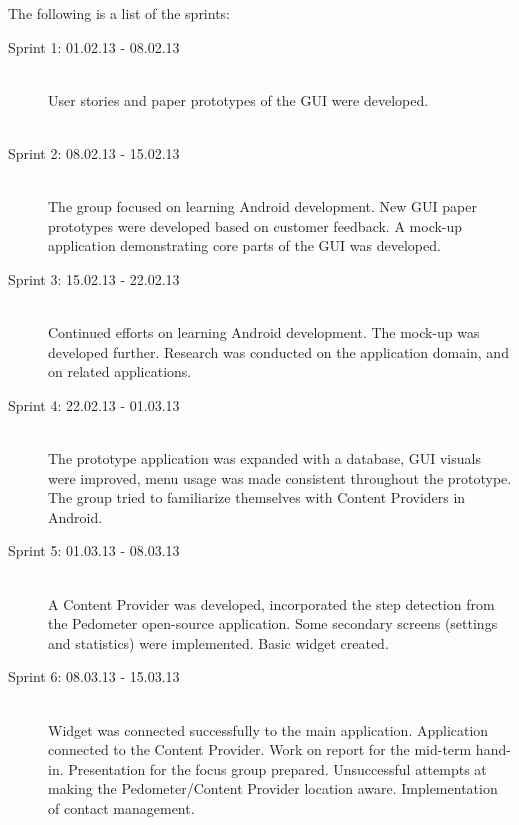 The following is a list of the sprints:

\begin{description}

 \item[Sprint 1: 01.02.13 - 08.02.13]   \hfill \\
User stories and paper prototypes of the GUI were developed.\\ 
 \\ \noindent\makebox[\linewidth]{\rule{\textwidth}{1pt}} 
 \item[Sprint 2: 08.02.13 - 15.02.13]    \hfill \\
The group focused on learning Android development. New GUI paper prototypes were developed based on customer feedback. A mock-up application demonstrating core parts of the GUI was developed.
 \\ \noindent\makebox[\linewidth]{\rule{\textwidth}{1pt}}
  \item[Sprint 3: 15.02.13 - 22.02.13]    \hfill \\
Continued efforts on learning Android development. The mock-up was developed further. Research was conducted on the application domain, and on related applications. 
 \\ \noindent\makebox[\linewidth]{\rule{\textwidth}{1pt}} 
 \item[Sprint 4: 22.02.13 - 01.03.13]    \hfill \\
The prototype application was expanded with a database, GUI visuals were improved, menu usage was made consistent throughout the prototype. The group tried to familiarize themselves with Content Providers in Android.
 \\ \noindent\makebox[\linewidth]{\rule{\textwidth}{1pt}} 
 \item[Sprint 5: 01.03.13 - 08.03.13]    \hfill \\
A Content Provider was developed, incorporated the step detection from the Pedometer open-source application. Some secondary screens (settings and statistics) were implemented. Basic widget created.
 \\ \noindent\makebox[\linewidth]{\rule{\textwidth}{1pt}} 
 \item[Sprint 6: 08.03.13 - 15.03.13]    \hfill \\
Widget was connected successfully to the main application. Application connected to the Content Provider. Work on report for the mid-term hand-in. Presentation for the focus group prepared. Unsuccessful attempts at making the Pedometer/Content Provider location aware. Implementation of contact management. 

\end{description}
